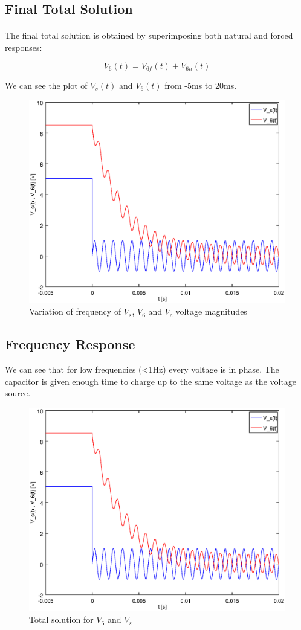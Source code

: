 \subsection{Final Total Solution}

\paragraph{} The final total solution is obtained by superimposing both natural and forced responses:

\begin{equation}
	V_6(t) = V_{6f}(t) + V_{6n}(t)
\end{equation}

We can see the plot of $V_s(t)$ and $V_6(t)$ from -5ms to 20ms.

\clearpage

\begin{figure}[!h]
	\centering
	\includegraphics[width=0.7\linewidth]{total.eps}
	\caption{Variation of frequency of $V_s$, $V_6$ and $V_c$ voltage magnitudes}
\end{figure}

\subsection{Frequency Response}

We can see that for low frequencies (<1Hz) every voltage is in phase. The capacitor is given enough time to charge up to the same voltage 
as the voltage source.

\begin{figure}[!h]
	\centering
	\includegraphics[width=0.7\linewidth]{total.eps}
	\caption{Total solution for $V_6$ and $V_s$}
\end{figure}

